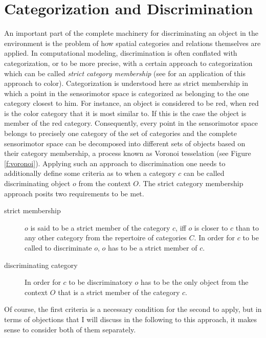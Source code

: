 \section{Categorization and Discrimination}
\label{s:categorization+discrimination}
An important part of the complete machinery for discriminating an object
in the environment is the problem of how spatial categories and relations
themselves are applied. In computational modeling, discrimination is often conflated with categorization,
or to be more precise, with a certain approach to categorization which can 
be called \emph{strict category membership} (see \citealp{belpaeme2007language} 
for an application of this approach to color). Categorization is understood here
as strict membership in which a point in the sensorimotor 
space is categorized as belonging
to the one category closest to him. For instance, an 
object is considered to be red, when red is the color category 
that it is most similar to. If this is the case the object is member
of the red category. Consequently, every point in the sensorimotor space 
belongs to precisely one category of the set of categories and the
complete sensorimotor space can be decomposed 
into different sets of objects based on their category membership, 
a process known as Voronoi tesselation \citep{aurenhammer1991voronoi} 
(see Figure \ref{f:voronoi}). Applying such an approach to discrimination one needs to additionally 
define some criteria as to when a category $c$ can be called discriminating
object $o$ from the context $O$. The strict category membership approach
posits two requirements to be met.
\begin{description}
\item[strict membership] $o$ is said to be a strict member of the category $c$, iff
 $o$ is closer to $c$ than to any other category from the repertoire of categories $C$.
 In order for $c$ to be called to discriminate $o$, $o$ has to be a strict member of $c$.
\item[discriminating category] In order for $c$ to be discriminatory
$o$ has to be the only object from the context $O$ that is a strict member of the category
$c$.
\end{description}
Of course, the first criteria is a necessary condition for the second to apply,
but in terms of objections that I will discuss in the following to this approach, 
it makes sense to consider both of them separately. 

